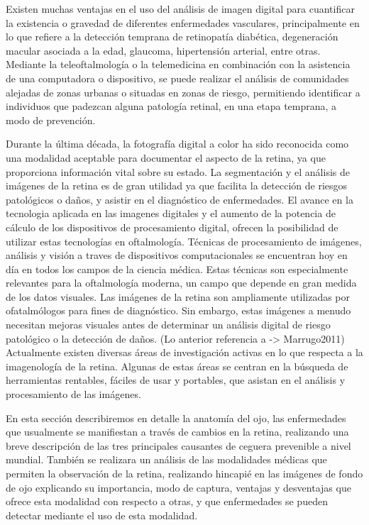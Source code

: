 Existen muchas ventajas en el uso del an\'alisis de imagen digital para cuantificar la existencia o gravedad de diferentes enfermedades vasculares, principalmente en lo que refiere a la detecci\'on temprana de retinopat\'ia diab\'etica, degeneraci\'on macular asociada a la edad,  glaucoma, hipertensi\'on arterial, entre otras.
Mediante la teleoftalmolog\'ia o la telemedicina en combinaci\'on con la asistencia de una computadora o dispositivo, se puede realizar el an\'alisis de comunidades alejadas de zonas urbanas o situadas en zonas de riesgo, permitiendo identificar a individuos que padezcan alguna patolog\'ia retinal, en una etapa temprana, a modo de prevenci\'on. \cite{kanagasingam2014progress}

Durante la \'ultima d\'ecada, la fotograf\'ia digital a color ha sido reconocida como una modalidad aceptable para documentar el aspecto de la retina, ya que proporciona informaci\'on vital sobre su estado. La segmentaci\'on y el an\'alisis de im\'agenes de la retina es de gran utilidad ya que facilita la detecci\'on de riesgos patol\'ogicos o da\~nos, y asistir en el diagn\'ostico de enfermedades. 
El avance en la tecnologia aplicada en las imagenes digitales y  el aumento de la potencia de c\'alculo de los dispositivos de procesamiento digital, ofrecen la posibilidad de utilizar estas tecnolog\'ias en oftalmolog\'ia. 
T\'ecnicas de procesamiento de imágenes, análisis y visión a traves de dispositivos computacionales se encuentran hoy en d\'ia en todos los campos de la ciencia m\'edica. Estas técnicas son especialmente relevantes para la oftalmología moderna, un campo que depende en gran medida de los datos visuales. Las im\'agenes de la retina son ampliamente utilizadas por ofatalm\'ologos para fines de diagn\'ostico. Sin embargo, estas im\'agenes a menudo necesitan mejoras visuales antes de determinar un an\'alisis digital de riesgo patol\'ogico o la detecci\'on de da\~nos. 
(Lo anterior referencia a -> Marrugo2011)
Actualmente existen diversas \'areas de investigación activas en lo que respecta a la imagenología de la retina. Algunas de estas \'areas se centran en la b\'usqueda de herramientas rentables, f\'aciles de usar y portables, que asistan en el an\'alisis y procesamiento de las im\'agenes.


En esta secci\'on describiremos en detalle la anatom\'ia del ojo, las enfermedades que usualmente se manifiestan a trav\'es de cambios en la retina, realizando una breve descripci\'on de las tres principales causantes de ceguera prevenible a nivel mundial. Tambi\'en se realizara un an\'alisis de las modalidades m\'edicas que permiten la observaci\'on de la retina, realizando hincapi\'e en las im\'agenes de fondo de ojo explicando su importancia, modo de captura, ventajas y desventajas que ofrece esta modalidad con respecto a otras, y que enfermedades se pueden detectar mediante el uso de esta modalidad.
